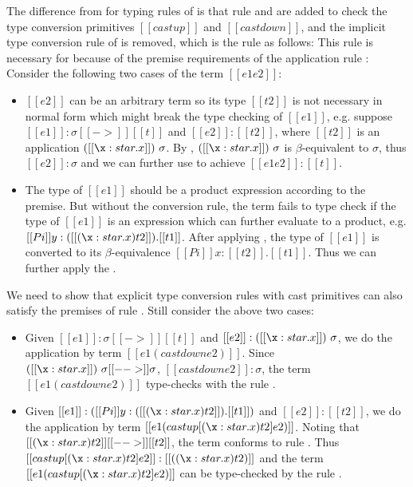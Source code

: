 The difference from \cc for typing rules of \expcc is that rule  and  are added to check the type conversion primitives $[[castup]]$ and $[[castdown]]$, and the implicit type conversion rule of \cc is removed, which is the rule as follows:
\ottusedrule{\ottdruleTccXXConv{}}
This rule is necessary for \cc because of the premise requirements of the application rule :
\ottusedrule{\ottdruleTXXApp{}}
Consider the following two cases of the term $[[e1 e2]]$:
\begin{itemize}
\item $[[e2]]$ can be an arbitrary term so its type $[[t2]]$ is not necessary in normal form which might break the type checking of $[[e1]]$, e.g. suppose $[[e1]]:\sigma [[->]] [[t]]$ and $[[e2]] : [[t2]]$, where $[[t2]]$ is an application $([[\x:star.x]])~\sigma$. By , $([[\x:star.x]])~\sigma$ is $\beta$-equivalent to $\sigma$, thus $[[e2]] : \sigma$ and we can further use  to achieve $[[e1 e2]] : [[t]]$.
\item The type of $[[e1]]$ should be a product expression according to the premise. But without the conversion rule, the term fails to type check if the type of $[[e1]]$ is an expression which can further evaluate to a product, e.g. $[[Pi]] y:([[(\x : star . x) t2]]).[[t1]]$. After applying , the type of $[[e1]]$ is converted to its $\beta$-equivalence $[[Pi]] x:[[t2]].[[t1]]$. Thus we can further apply the .
\end{itemize}

We need to show that explicit type conversion rules with cast primitives can also satisfy the premises of rule . Still consider the above two cases:
\begin{itemize}
\item Given $[[e1]]:\sigma [[->]] [[t]]$ and $[[e2]] : ([[\x:star.x]])~\sigma$, we do the application by term $[[e1 (castdown e2)]]$. Since $([[\x:star.x]])~\sigma [[-->]] \sigma$, $[[castdown e2]] : \sigma$, the term $[[e1 (castdown e2)]]$ type-checks with the rule .
\item Given $[[e1]] : ([[Pi]] y:([[(\x : star . x) t2]]).[[t1]])$ and $[[e2]] : [[t2]]$, we do the application by term $[[e1 (castup [ (\x : star . x) t2 ] e2)]]$. Noting that $[[(\x : star . x) t2]] [[-->]] [[t2]]$, the term conforms to rule . Thus $[[castup [ (\x : star . x) t2 ] e2]] : [[((\x : star . x) t2)]]$ and the term $[[e1 (castup [ (\x : star . x) t2 ] e2)]]$ can be type-checked by the rule .
\end{itemize}

